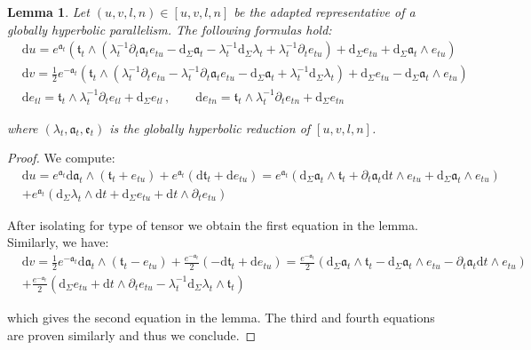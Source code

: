 \documentclass[10pt,reqno,a4paper]{amsart}
\theoremstyle{plain}
\newtheorem{lemma}[thm]{Lemma}
\theoremstyle{definition}
\theoremstyle{remark}
\theoremstyle{remark}
\newcommand{\frt}{\mathfrak{t}}
\def\dd{\mathrm{d}}
\def\fra{\mathfrak{a}}
\def\fre{\mathfrak{e}}
\renewcommand{\(}{ (}
\renewcommand{\)}{ )}
\begin{document}
\begin{lemma}
\label{lemma:derivativeadaptedcoframe}
Let $(u,v,l,n)\in [u,v,l,n]$ be the adapted representative of a globally hyperbolic parallelism. The following formulas hold:
\begin{eqnarray*}
& \dd u = e^{\fra_t} ( \frt_t \wedge (\lambda_t^{-1}\partial_t \fra_t e_{tu} - \dd_{\Sigma} \fra_t - \lambda_t^{-1} \dd_{\Sigma} \lambda_t + \lambda_t^{-1} \partial_t e_{tu}) + \dd_{\Sigma} e_{tu} + \dd_{\Sigma} \fra_t \wedge e_{tu})\\
& \dd v = \frac{1}{2} e^{-\fra_t} ( \frt_t \wedge (\lambda_t^{-1} \partial_t e_{tu} - \lambda_t^{-1}\partial_t \fra_t e_{tu} - \dd_{\Sigma} \fra_t + \lambda_t^{-1} \dd_{\Sigma} \lambda_t) + \dd_{\Sigma} e_{tu} - \dd_{\Sigma} \fra_t \wedge e_{tu})\\
& \dd e_{tl} = \frt_t \wedge \lambda_t^{-1} \partial_t e_{tl} + \dd_{\Sigma} e_{tl} \, , \qquad \dd e_{tn} = \frt_t \wedge \lambda_t^{-1} \partial_t e_{tn} + \dd_{\Sigma} e_{tn} 
\end{eqnarray*}
	
\noindent
where $(\lambda_t,\fra_t,\fre_t)$ is the globally hyperbolic reduction of $[u,v,l,n]$.
\end{lemma}

\begin{proof}
We compute:
\begin{eqnarray*}
& \dd u = e^{\fra_t} \dd \fra_t \wedge (\mathfrak{t}_t + e_{tu}) + e^{\fra_t} (\dd\mathfrak{t}_t + \dd e_{tu}) = e^{\fra_t} (\dd_{\Sigma} \fra_t \wedge \mathfrak{t}_t + \partial_t \fra_t \dd t\wedge e_{tu} + \dd_{\Sigma} \fra_t \wedge e_{tu} )\\
& + e^{\fra_t} (\dd_{\Sigma} \lambda_t \wedge \dd t + \dd_{\Sigma} e_{tu} + \dd t \wedge \partial_t e_{tu})
\end{eqnarray*}

\noindent
After isolating for type of tensor we obtain the first equation in the lemma. Similarly, we have:
\begin{eqnarray*}
& \dd v = \frac{1}{2}e^{-\fra_t}  \dd \fra_t \wedge (\mathfrak{t}_t - e_{tu}) +  \frac{e^{-\fra_t}}{2} (- \dd\mathfrak{t}_t + \dd e_{tu}) =  \frac{e^{-\fra_t}}{2} ( \dd_{\Sigma} \fra_t \wedge \mathfrak{t}_t - \dd_{\Sigma} \fra_t\wedge e_{tu} - \partial_t \fra_t \dd t \wedge e_{tu})\\
& +  \frac{e^{-\fra_t}}{2} (\dd_{\Sigma} e_{tu} + \dd t \wedge \partial_t e_{tu} - \lambda_t^{-1}\dd_{\Sigma}\lambda_t \wedge \mathfrak{t}_t)
\end{eqnarray*}

\noindent
which gives the second equation in the lemma. The third and fourth equations are proven similarly and thus we conclude. 
\end{proof}
\end{document}
